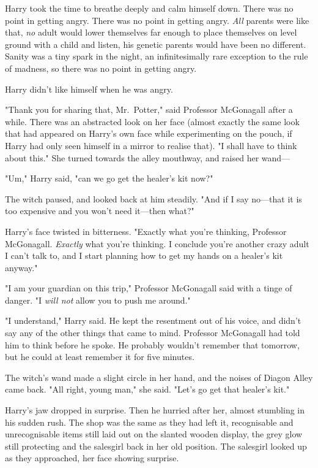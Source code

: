 Harry took the time to breathe deeply and calm himself down. There was no point
in getting angry. There was no point in getting angry. \emph{All} parents were
like that, \emph{no} adult would lower themselves far enough to place
themselves on level ground with a child and listen, his genetic parents would
have been no different. Sanity was a tiny spark in the night, an
infinitesimally rare exception to the rule of madness, so there was no point in
getting angry.

Harry didn't like himself when he was angry.

"Thank you for sharing that, Mr.~Potter," said Professor McGonagall after a
while. There was an abstracted look on her face (almost exactly the same look
that had appeared on Harry's own face while experimenting on the pouch, if
Harry had only seen himself in a mirror to realise that). "I shall have to
think about this." She turned towards the alley mouthway, and raised her wand---

"Um," Harry said, "can we go get the healer's kit now?"

The witch paused, and looked back at him steadily. "And if I say no---that it
is too expensive and you won't need it---then what?"

Harry's face twisted in bitterness. "Exactly what you're thinking, Professor
McGonagall. \emph{Exactly} what you're thinking. I conclude you're another
crazy adult I can't talk to, and I start planning how to get my hands on a
healer's kit anyway."

"I am your guardian on this trip," Professor McGonagall said with a tinge of
danger. "I \emph{will not} allow you to push me around."

"I understand," Harry said. He kept the resentment out of his voice, and didn't
say any of the other things that came to mind. Professor McGonagall had told
him to think before he spoke. He probably wouldn't remember that tomorrow, but
he could at least remember it for five minutes.

The witch's wand made a slight circle in her hand, and the noises of Diagon
Alley came back. "All right, young man," she said. "Let's go get that healer's
kit."

Harry's jaw dropped in surprise. Then he hurried after her, almost stumbling in
his sudden rush.
\later
The shop was the same as they had left it, recognisable and unrecognisable
items still laid out on the slanted wooden display, the grey glow still
protecting and the salesgirl back in her old position. The salesgirl looked up
as they approached, her face showing surprise.

